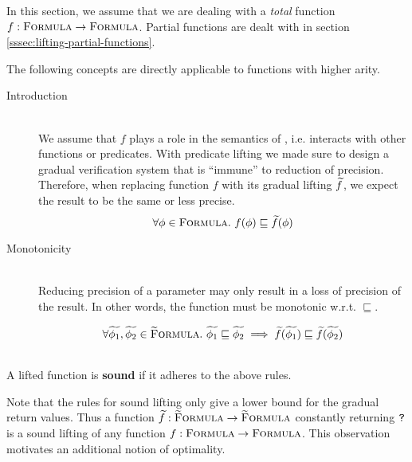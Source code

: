 
In this section, we assume that we are dealing with a \emph{total} function $f : \textup{\textsc{Formula}} \rightarrow \textup{\textsc{Formula}}$.
Partial functions are dealt with in section \ref{sssec:lifting-partial-functions}.

The following concepts are directly applicable to functions with higher arity.

\begin{description}
    \item[Introduction]~\\
    We assume that $f$ plays a role in the semantics of \svl, i.e. interacts with other functions or predicates.
    With predicate lifting we made sure to design a gradual verification system that is “immune” to reduction of precision.
    Therefore, when replacing function $f$ with its gradual lifting $\widetilde{f}$, we expect the result to be the same or less precise.
    \begin{displaymath}
    \forall \phi \in \textup{\textsc{Formula}}.~ f(\phi) \sqsubseteq \widetilde{f}(\phi)
    \end{displaymath}
    
    \item[Monotonicity]~\\
    Reducing precision of a parameter may only result in a loss of precision of the result.
    In other words, the function must be monotonic w.r.t. $\sqsubseteq$.
    
    \begin{displaymath}
    \forall \widetilde{\phi_1}, \widetilde{\phi_2} \in \textup{\textsc{\ensuremath{\widetilde{\text{F}}}ormula}}.~ 
    \widetilde{\phi_1} \sqsubseteq \widetilde{\phi_2} 
    \implies 
    \widetilde{f}(\widetilde{\phi_1}) \sqsubseteq \widetilde{f}(\widetilde{\phi_2})
    \end{displaymath}
\end{description}

\begin{definition}~\\
    A lifted function is \textbf{sound} if it adheres to the above rules.
\end{definition}

Note that the rules for sound lifting only give a lower bound for the gradual return values.
Thus a function $\widetilde{f} : \textup{\textsc{\ensuremath{\widetilde{\text{F}}}ormula}} \rightarrow \textup{\textsc{\ensuremath{\widetilde{\text{F}}}ormula}}$ constantly returning $\textup{\texttt{?}}$ is a sound lifting of any function $f : \textup{\textsc{Formula}} \rightarrow \textup{\textsc{Formula}}$.
This observation motivates an additional notion of optimality.

